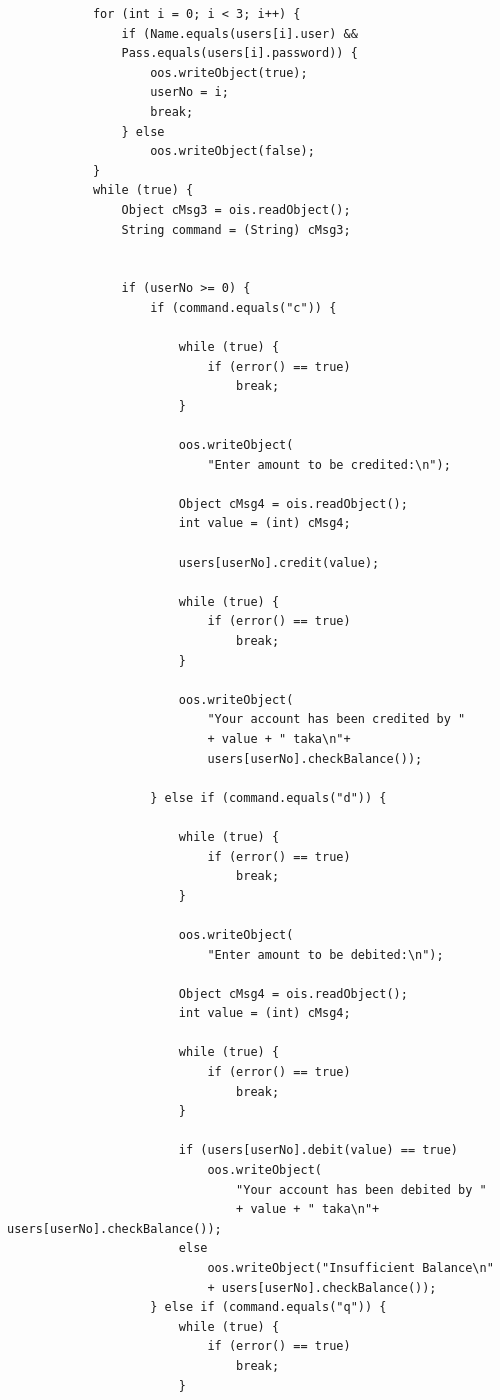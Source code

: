 \documentclass[11pt]{article}
\begin{document}
\begin{verbatim}
            for (int i = 0; i < 3; i++) {
                if (Name.equals(users[i].user) && 
                Pass.equals(users[i].password)) {
                    oos.writeObject(true);
                    userNo = i;
                    break;
                } else
                    oos.writeObject(false);
            }
            while (true) {
                Object cMsg3 = ois.readObject();
                String command = (String) cMsg3;


                if (userNo >= 0) {
                    if (command.equals("c")) {

                        while (true) {
                            if (error() == true)
                                break;
                        }

                        oos.writeObject(
                            "Enter amount to be credited:\n");

                        Object cMsg4 = ois.readObject();
                        int value = (int) cMsg4;

                        users[userNo].credit(value);

                        while (true) {
                            if (error() == true)
                                break;
                        }

                        oos.writeObject(
                            "Your account has been credited by " 
                            + value + " taka\n"+ 
                            users[userNo].checkBalance());

                    } else if (command.equals("d")) {

                        while (true) {
                            if (error() == true)
                                break;
                        }

                        oos.writeObject(
                            "Enter amount to be debited:\n");

                        Object cMsg4 = ois.readObject();
                        int value = (int) cMsg4;

                        while (true) {
                            if (error() == true)
                                break;
                        }

                        if (users[userNo].debit(value) == true)
                            oos.writeObject(
                                "Your account has been debited by " 
                                + value + " taka\n"+ users[userNo].checkBalance());
                        else
                            oos.writeObject("Insufficient Balance\n" 
                            + users[userNo].checkBalance());
                    } else if (command.equals("q")) {
                        while (true) {
                            if (error() == true)
                                break;
                        }


\end{verbatim}
\end{document}
